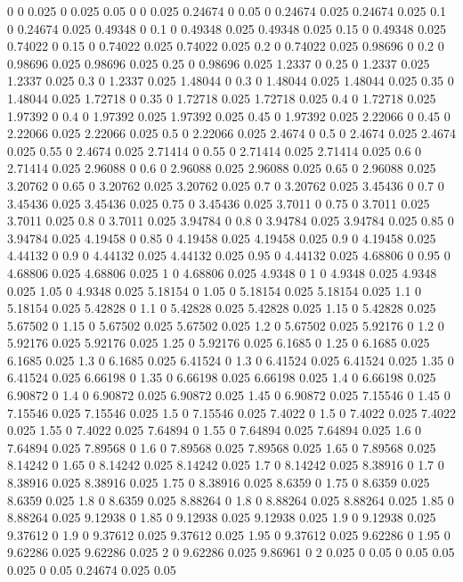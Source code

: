 0 0
0.025 0
0.025 0.05
0 0
0.025 0.24674
0 0.05
0 0.24674
0.025 0.24674
0.025 0.1
0 0.24674
0.025 0.49348
0 0.1
0 0.49348
0.025 0.49348
0.025 0.15
0 0.49348
0.025 0.74022
0 0.15
0 0.74022
0.025 0.74022
0.025 0.2
0 0.74022
0.025 0.98696
0 0.2
0 0.98696
0.025 0.98696
0.025 0.25
0 0.98696
0.025 1.2337
0 0.25
0 1.2337
0.025 1.2337
0.025 0.3
0 1.2337
0.025 1.48044
0 0.3
0 1.48044
0.025 1.48044
0.025 0.35
0 1.48044
0.025 1.72718
0 0.35
0 1.72718
0.025 1.72718
0.025 0.4
0 1.72718
0.025 1.97392
0 0.4
0 1.97392
0.025 1.97392
0.025 0.45
0 1.97392
0.025 2.22066
0 0.45
0 2.22066
0.025 2.22066
0.025 0.5
0 2.22066
0.025 2.4674
0 0.5
0 2.4674
0.025 2.4674
0.025 0.55
0 2.4674
0.025 2.71414
0 0.55
0 2.71414
0.025 2.71414
0.025 0.6
0 2.71414
0.025 2.96088
0 0.6
0 2.96088
0.025 2.96088
0.025 0.65
0 2.96088
0.025 3.20762
0 0.65
0 3.20762
0.025 3.20762
0.025 0.7
0 3.20762
0.025 3.45436
0 0.7
0 3.45436
0.025 3.45436
0.025 0.75
0 3.45436
0.025 3.7011
0 0.75
0 3.7011
0.025 3.7011
0.025 0.8
0 3.7011
0.025 3.94784
0 0.8
0 3.94784
0.025 3.94784
0.025 0.85
0 3.94784
0.025 4.19458
0 0.85
0 4.19458
0.025 4.19458
0.025 0.9
0 4.19458
0.025 4.44132
0 0.9
0 4.44132
0.025 4.44132
0.025 0.95
0 4.44132
0.025 4.68806
0 0.95
0 4.68806
0.025 4.68806
0.025 1
0 4.68806
0.025 4.9348
0 1
0 4.9348
0.025 4.9348
0.025 1.05
0 4.9348
0.025 5.18154
0 1.05
0 5.18154
0.025 5.18154
0.025 1.1
0 5.18154
0.025 5.42828
0 1.1
0 5.42828
0.025 5.42828
0.025 1.15
0 5.42828
0.025 5.67502
0 1.15
0 5.67502
0.025 5.67502
0.025 1.2
0 5.67502
0.025 5.92176
0 1.2
0 5.92176
0.025 5.92176
0.025 1.25
0 5.92176
0.025 6.1685
0 1.25
0 6.1685
0.025 6.1685
0.025 1.3
0 6.1685
0.025 6.41524
0 1.3
0 6.41524
0.025 6.41524
0.025 1.35
0 6.41524
0.025 6.66198
0 1.35
0 6.66198
0.025 6.66198
0.025 1.4
0 6.66198
0.025 6.90872
0 1.4
0 6.90872
0.025 6.90872
0.025 1.45
0 6.90872
0.025 7.15546
0 1.45
0 7.15546
0.025 7.15546
0.025 1.5
0 7.15546
0.025 7.4022
0 1.5
0 7.4022
0.025 7.4022
0.025 1.55
0 7.4022
0.025 7.64894
0 1.55
0 7.64894
0.025 7.64894
0.025 1.6
0 7.64894
0.025 7.89568
0 1.6
0 7.89568
0.025 7.89568
0.025 1.65
0 7.89568
0.025 8.14242
0 1.65
0 8.14242
0.025 8.14242
0.025 1.7
0 8.14242
0.025 8.38916
0 1.7
0 8.38916
0.025 8.38916
0.025 1.75
0 8.38916
0.025 8.6359
0 1.75
0 8.6359
0.025 8.6359
0.025 1.8
0 8.6359
0.025 8.88264
0 1.8
0 8.88264
0.025 8.88264
0.025 1.85
0 8.88264
0.025 9.12938
0 1.85
0 9.12938
0.025 9.12938
0.025 1.9
0 9.12938
0.025 9.37612
0 1.9
0 9.37612
0.025 9.37612
0.025 1.95
0 9.37612
0.025 9.62286
0 1.95
0 9.62286
0.025 9.62286
0.025 2
0 9.62286
0.025 9.86961
0 2
0.025 0
0.05 0
0.05 0.05
0.025 0
0.05 0.24674
0.025 0.05

